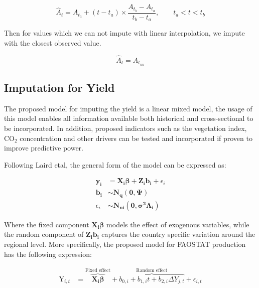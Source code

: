 \documentclass[nojss]{jss}\usepackage[]{graphicx}\usepackage[]{color}
\begin{document}
\begin{equation}
  \label{eq:linearInterpolation}
  \hat{A}_t = A_{t_a} + (t - t_a) \times \frac{A_{t_b} - A_{t_a}}{t_b
    - t_a}, \quad\quad t_a < t < t_b
\end{equation}

Then for values which we can not impute with linear interpolation, we
impute with the closest observed value.

\begin{equation}
  \label{eq:locf}
  \hat{A}_t = A_{t_{nn}}
\end{equation}



\subsection{Imputation for Yield}
The proposed model for imputing the yield is a linear mixed model, the
usage of this model enables all information available both
historical and cross-sectional to be incorporated. In addition,
proposed indicators such as the vegetation index, $\text{CO}_2$
concentration and other drivers can be tested and incorporated if
proven to improve predictive power.

Following Laird etal, the general form of the model can be expressed
as:

\begin{align}
  \mathbf{y_i} &= \mathbf{X_i}\boldsymbol{\beta} +
  \mathbf{Z_i}\mathbf{b_i} + \epsilon_i \nonumber\\
  \mathbf{b_i} &\sim \mathbf{N_q}(\mathbf{0}, \boldsymbol{\Psi})\nonumber\\
  \epsilon_i &\sim \mathbf{N_{ni}}(\mathbf{0},
  \boldsymbol{\sigma^2}\boldsymbol{\Lambda_i})
\end{align}

Where the fixed component $\mathbf{X_i}\boldsymbol{\beta}$ models the
effect of exogenous variables, while the random component of
$\mathbf{Z_i}\mathbf{b_i}$ captures the country specific variation
around the regional level.  More specifically, the proposed model for
FAOSTAT production has the following expression:

\begin{align}
  \label{eq:lmeImpute}
  \text{Y}_{i,t} &= \overbrace{\mathbf{X_i}\boldsymbol{\beta}}^{\text{Fixed effect}} +
  \overbrace{b_{0,i} + b_{1,i}t + b_{2,i}\Delta{Y}_{j,t}}^{\text{Random effect}} +
  \epsilon_{i,t}
\end{align}
\end{document}
